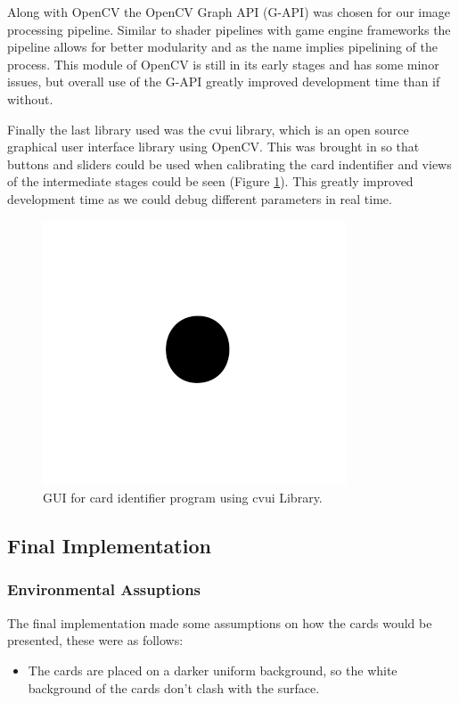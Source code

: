 \documentclass[conference]{IEEEtran}
\begin{document}
Along with OpenCV the OpenCV Graph API (G-API) was chosen for our image processing pipeline. Similar
to shader pipelines with game engine frameworks the pipeline allows for better modularity and as the
name implies pipelining of the process. This module of OpenCV is still in its early stages and has
some minor issues, but overall use of the G-API greatly improved development time than if without.

Finally the last library used was the cvui library, which is an open source graphical user interface
library using OpenCV. This was brought in so that buttons and sliders could be used when calibrating
the card indentifier and views of the intermediate stages could be seen (Figure \ref{fig:gui}). This
greatly improved development time as we could debug different parameters in real time.

\begin{figure}[htbp]
\centerline{\includegraphics{fig1.png}}
\caption{GUI for card identifier program using cvui Library.}
\label{fig:gui}
\end{figure}


\subsection{Final Implementation}

\subsubsection{Environmental Assuptions} %
The final implementation made some assumptions on how the cards would be presented, these were as
follows:
\begin{itemize}
    \item The cards are placed on a darker uniform background, so the white background of the cards
        don't clash with the surface.
\end{itemize}
\end{document}
